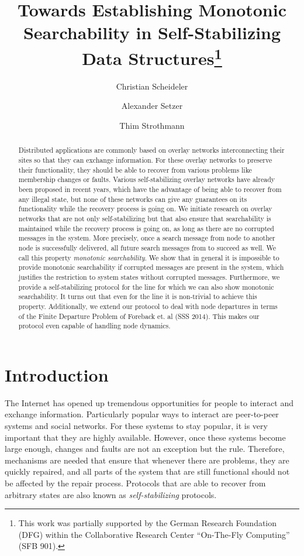\documentclass[a4paper,USenglish]{lipics}
\title{Towards Establishing Monotonic Searchability in Self-Stabilizing Data Structures\footnote{This work was partially supported by the German Research Foundation (DFG) within the Collaborative Research Center ``On-The-Fly Computing'' (SFB 901).}}
\author[1]{Christian Scheideler}
\author[2]{Alexander Setzer}
\author[3]{Thim Strothmann}
\affil[1]{Paderborn University\\
  Fürstenallee 11, Paderborn, Germany}
\affil[2]{Paderborn University\\
  Fürstenallee 11, Paderborn, Germany}
\affil[3]{Paderborn University\\
  Fürstenallee 11, Paderborn, Germany}
\begin{document}
\maketitle

\begin{abstract}
Distributed applications are commonly based on overlay networks interconnecting their sites so that they can exchange information. 
For these overlay networks to preserve their functionality, they should be able to recover from various problems like membership changes or faults. 
Various self-stabilizing overlay networks have already been proposed in recent years, which have the advantage of being able to recover from any illegal state, but none of these networks can give any guarantees on its functionality while the recovery process is going on. 
We initiate research on overlay networks that are not only self-stabilizing but that also ensure that searchability is maintained while the recovery process is going on, as long as there are no corrupted messages in the system. 
More precisely, once a search message from node  to another node  is successfully delivered, all future search messages from  to  succeed as well. 
We call this property {\em monotonic searchability}.
 We show that in general it is impossible to provide monotonic searchability if corrupted messages are present in the system, which justifies the restriction to system states without corrupted messages. 
 Furthermore, we provide a self-stabilizing protocol for the line for which we can also show monotonic searchability. 
 It turns out that even for the line it is non-trivial to achieve this property. 
 Additionally, we extend our protocol to deal with node departures in terms of the Finite Departure Problem of Foreback et. al (SSS 2014). 
 This makes our protocol even capable of handling node dynamics.
 \end{abstract}


\section{Introduction}
The Internet has opened up tremendous opportunities for people to interact and exchange information.
 Particularly popular ways to interact are peer-to-peer systems and social networks. 
 For these systems to stay popular, it is very important that they are highly available. 
 However, once these systems become large enough, changes and faults are not an exception but the rule.
Therefore, mechanisms are needed that ensure that whenever there are problems, they are quickly repaired, and all parts of the system that are still functional should not be affected by the repair process. 
Protocols that are able to recover from arbitrary states are also known as \emph{self-stabilizing} protocols.
\end{document}
